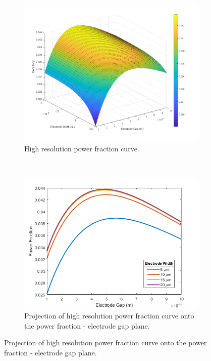 \begin{figure}[h]
    \centering
    \begin{subfigure}[b]{0.7\textwidth}
        \centering
        \includegraphics[width=\textwidth]{images/hiResPowerSensitivity.png}
        \caption{High resolution power fraction curve.}
    \end{subfigure}
    \\
    \vspace{0.1 in}
    \begin{subfigure}[b]{0.49\textwidth}
        \centering
        \includegraphics[width=\textwidth]{images/hiResPowerVsGap.png}
        \caption{Projection of high resolution power fraction curve onto the power fraction - electrode gap plane.}

\end{subfigure}
\end{figure}
